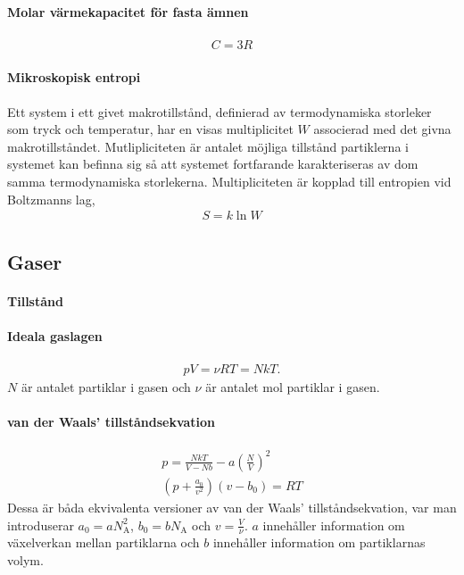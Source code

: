\paragraph{Molar värmekapacitet för fasta ämnen}
\begin{align*}
	C = 3R
\end{align*}

\paragraph{Mikroskopisk entropi}
Ett system i ett givet makrotillstånd, definierad av termodynamiska storleker som tryck och temperatur, har en visas multiplicitet $W$ associerad med det givna makrotillståndet. Mutlipliciteten är antalet möjliga tillstånd partiklerna i systemet kan befinna sig så att systemet fortfarande karakteriseras av dom samma termodynamiska  storlekerna. Multipliciteten är kopplad till entropien vid Boltzmanns lag,
\begin{align*}
	S = k\ln{W}
\end{align*}

\subsection{Gaser}

\paragraph{Tillstånd}

\paragraph{Ideala gaslagen}
\begin{align*}
	pV = \nu RT = NkT.
\end{align*}
$N$ är antalet partiklar i gasen och $\nu$ är antalet mol partiklar i gasen.

\paragraph{van der Waals' tillståndsekvation}
\begin{align*}
	p = \frac{NkT}{V - Nb} - a\left(\frac{N}{V}\right)^2\\
	\left(p + \frac{a_0}{v^2}\right)(v - b_0) = RT
\end{align*}
Dessa är båda ekvivalenta versioner av van der Waals' tillståndsekvation, var man introduserar $a_0 = a N_\text{A}^2$, $b_0 = bN_\text{A}$ och $v = \frac{V}{\nu}$. $a$ innehåller information om växelverkan mellan partiklarna och $b$ innehåller information om partiklarnas volym.

